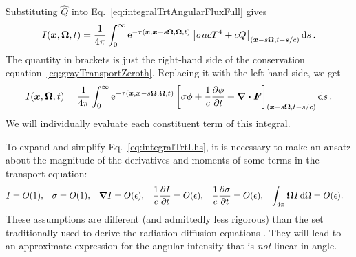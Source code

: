 \documentclass[11pt,letter,twoside]{mc2011}
\newcommand{\epsiloncolor}[1]{#1}
\begin{document}
Substituting $\hat Q$ into Eq.~\eqref{eq:integralTrtAngularFluxFull} gives
\begin{equation*}
    I(\bm{x}, \bm{\Omega}, t)
    = \frac{1}{4\pi}\int_{0}^{\infty}
    \mathop{}\!\mathrm{e}^{ -\tau(\bm{x}, \bm{x} - s \bm{\Omega}, \bm{\Omega}, t)}
    \left[ \sigma a c T^4 + c Q \right]_{(\bm{x} - s
    \bm{\Omega}, t-s/c)} \mathop{}\!\mathrm{d} s\,.
\end{equation*}
The quantity in brackets is just the right-hand side of the conservation
equation~\eqref{eq:grayTransportZeroth}. Replacing it with the left-hand
side, we get
\begin{equation}\label{eq:integralTrtLhs}
    I(\bm{x}, \bm{\Omega}, t)
    = \frac{1}{4\pi}\int_{0}^{\infty}
    \mathop{}\!\mathrm{e}^{ -\tau(\bm{x}, \bm{x} - s \bm{\Omega}, \bm{\Omega}, t)}
    \left[ \sigma \phi + \frac{1}{c} \frac{\partial \phi}{\partial t} +\bm{\nabla} \bm{\cdot} \bm{F}
    \right]_{(\bm{x} - s \bm{\Omega}, t-s/c)} \mathop{}\!\mathrm{d} s\,.
\end{equation}
We will individually evaluate each constituent term of this integral.

To expand and simplify Eq.~\eqref{eq:integralTrtLhs}, it is necessary to make
an ansatz about
the magnitude of the derivatives and moments of some terms in the transport
equation:
\begin{align*}
  I &= O(\epsiloncolor{1}), &
  \sigma &= O(\epsiloncolor{1}), &
  \del I &= O(\epsiloncolor{\epsilon}), &
  \frac1c\pder{I}{t} &= O(\epsiloncolor{\epsilon}), &
  \frac1c\pder{\sigma}{t} &= O(\epsiloncolor{\epsilon}), &
  \int_{4\pi} \vec{\Omega} I\ud \Omega &= O(\epsiloncolor{\epsilon}).
\end{align*}
These assumptions are different (and admittedly less rigorous) than the set traditionally
used to derive the radiation diffusion equations \cite{Lar1983a}. They will
lead to an approximate expression for the angular intensity that is
\emph{not} linear in angle.
\end{document}
